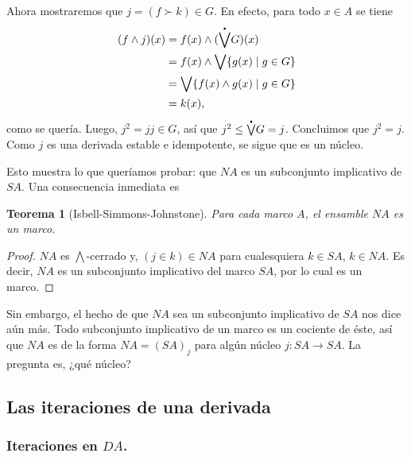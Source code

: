 \documentclass[12pt,letterpaper,titlepage]{article}
\newtheorem{thm}{Teorema}
\theoremstyle{definition}
\newcommand\Sup{\bigvee}
\renewcommand\inf{\wedge}
\newcommand\Inf{\bigwedge}
\newcommand\pSup{%
    {\stackrel{\raisebox{-3pt}{\scalebox{0.5}{$\bullet$}}}{\bigvee}}
  }%
\newcommand\tps[2]{\texorpdfstring{#1}{#2}}
\newcommand\<{\langle}
\renewcommand\>{\rangle}
\begin{document}
Ahora mostraremos que $j=(f\succ k)\in G$.
En efecto, para todo $x\in A$ se tiene
\begin{align*}
  (f\inf j)(x)
  &= f(x) \inf (\pSup G)(x) \\
  &= f(x) \inf \Sup\{g(x) \mid g\in G\} \\
  &= \Sup\{f(x) \inf g(x) \mid g\in G\} \\
  &= k(x),
\end{align*}
como se quería.
Luego, $j^2=jj\in G$, así que $j^2\leq\pSup G = j$.
Concluimos que $j^2=j$.
Como $j$ es una derivada estable e idempotente,
se sigue que es un núcleo.

Esto muestra lo que queríamos probar: que $NA$ es un subconjunto
implicativo de $SA$.
Una consecuencia inmediata es

\begin{thm}[Isbell-Simmons-Johnstone]
  Para cada marco $A$, el ensamble $NA$ es un marco.
\end{thm}
\begin{proof}
    $NA$ es $\Inf$-cerrado y, $(j\in k)\in NA$ para cualesquiera
    $k\in SA$, $k\in NA$.
    Es decir, $NA$ es un subconjunto implicativo del marco $SA$,
    por lo cual es un marco.
\end{proof}
Sin embargo, el hecho de que $NA$ sea un subconjunto
implicativo de $SA$ nos dice aún más.
Todo subconjunto implicativo de un marco es un cociente de éste,
así que $NA$ es de la forma $NA=(SA)_j$ para algún núcleo
$j:SA\to SA$.
La pregunta es, ¿qué núcleo?

\subsection{Las iteraciones de una derivada}
\subsubsection{Iteraciones en \tps{$DA$}{DA}.}
\end{document}
